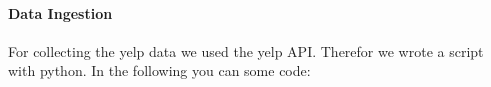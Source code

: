 \paragraph{Data Ingestion}
\label{par:ingestion}
For collecting the yelp data we used the yelp API. Therefor we wrote a script with python. In the following you can some code:
